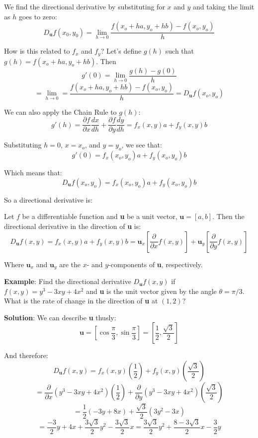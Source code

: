 We find the directional derivative by substituting for $x$ and $y$ and taking 
the limit as $h$ goes to zero:
$$D_{\textbf{u}} f(x_0, y_0) = \lim_{h \to 0} \frac{f(x_o + ha, y_o + hb) - 
f(x_o, y_o)}{h}$$

How is this related to $f_x$ and $f_y$? Let's define $g(h)$ such that $g(h) = 
f(x_o + ha, y_o + hb)$. Then
$$g'(0) = \lim_{h \to 0} \frac{g(h) - g(0)}{h}$$
$$= \lim_{h \to 0} = \frac{f(x_o + ha, y_o + hb) - f(x_o, y_o)}{h} = 
D_{\textbf{u}} f(x_o, y_o)$$

We can also apply the Chain Rule to $g(h)$:
$$g'(h) = \frac{\partial f}{\partial x} \frac{dx}{dh} + \frac{\partial f}{
\partial y} \frac{dy}{dh} = f_x(x, y)a + f_y(x, y)b$$

Substituting $h = 0$, $x = x_o$, and $y = y_o$, we see that:
$$g'(0) = f_x(x_o, y_o)a + f_y(x_o, y_o)b$$

Which means that:
$$D_{\textbf{u}} f(x_o, y_o) = f_x(x_o, y_o)a + f_y(x_o, y_o)b$$

So a directional derivative is:

\begin{mdframed}[style = important, frametitle = {The Directional Derivative}]
Let $f$ be a differentiable function and \textbf{u} be a unit vector, 
$\textbf{u} = \left[ a, b \right]$. Then the directional derivative in the 
direction of \textbf{u} is:
\begin{equation}
    D_{\textbf{u}} f(x, y) = f_x(x, y)a + f_y(x, y)b = \textbf{u}_x \left[ 
    \frac{\partial}{\partial x} f(x, y) \right] + \textbf{u}_y \left[ \frac{
    \partial}{\partial y} f(x, y) \right]
    \label{eq:directionalDeriv}
\end{equation}

Where $\textbf{u}_x$ and $\textbf{u}_y$ are the $x$- and $y$-components of 
\textbf{u}, respectively. 
\end{mdframed}


\textbf{Example}: Find the directional derivative $D_{\textbf{u}} f(x, y)$ if 
$f(x, y) = y^3 - 3xy + 4x^2$ and \textbf{u} is the unit vector given by the 
angle $\theta = \pi/3$. What is the rate of change in the direction of 
\textbf{u} at $(1, 2)$?

\textbf{Solution}: We can describe \textbf{u} thusly:
$$\textbf{u} = \left[ \cos{ \frac{\pi}{3} }, \sin{ \frac{\pi}{3}} \right] = 
\left[ \frac{1}{2}, \frac{\sqrt{3}}{2} \right]$$

And therefore:
$$D_{\textbf{u}} f(x, y) = f_x(x, y) \left( \frac{1}{2} \right) + f_y(x, y) 
\left( \frac{\sqrt{3}}{2} \right) $$
$$= \frac{\partial}{\partial x} \left( y^3 - 3xy + 4x^2 \right) \left( 
\frac{1}{2} \right) + \frac{\partial}{\partial y} \left( y^3 - 3xy + 4x^2 
\right) \left( \frac{\sqrt{3}}{2} \right)$$
$$= \frac{1}{2} \left( -3y + 8x \right) + \frac{\sqrt{3}}{2} \left( 3y^2 - 3x 
\right)$$
$$= \frac{-3}{2}y + 4x + \frac{3\sqrt{3}}{2}y^2 - \frac{3\sqrt{3}}{2}x = \frac{
3\sqrt{3}}{2}y^2 + \frac{8-3\sqrt{3}}{2}x - \frac{3}{2}y$$

